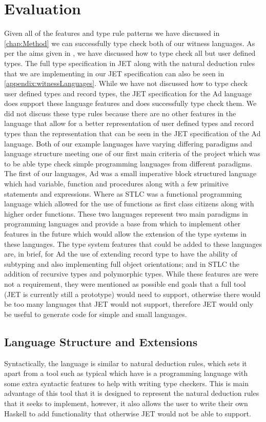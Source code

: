 \chapter{Evaluation}
Given all of the features and type rule patterns we have discussed in \autoref{chap:Method} we can successfully type check both of our witness languages.
As per the aims given in , we have discussed how to type check all but user defined types.
The full type specification in JET along with the natural deduction rules that we are implementing in our JET specification can also be seen in \autoref{appendix:witnessLanguages}.
While we have not discussed how to type check user defined types and record types, the JET specification for the Ad language does support these language features and does successfully type check them.
We did not discuss these type rules because there are no other features in the language that allow for a better representation of user defined types and record types than the representation that can be seen in the JET specification of the Ad language.
Both of our example languages have varying differing paradigms and language structure meeting one of our first main criteria of the project which was to be able type check simple programming languages from different paradigms.
The first of our languages, Ad was a small imperative block structured language which had variable, function and procedures along with a few primitive statements and expressions.
Where as STLC was a functional programming language which allowed for the use of functions as first class citizens along with higher order functions.
These two languages represent two main paradigms in programming languages and provide a base from which to implement other features in the future which would allow the extension of the type systems in these languages.
The type system features that could be added to these languages are, in brief, for Ad the use of extending record type to have the ability of subtyping and also implementing full object orientations; and in STLC the addition of recursive types\cite{pierce2002types,cardelli1996type} and polymorphic types\cite{Cardelli:1985:UTD:6041.6042}.
While these features are were not a requirement, they were mentioned as possible end goals that a full tool (JET is currently still a prototype) would need to support, otherwise there would be too many languages that JET would not support, therefore JET would  only be useful to generate code for simple and small languages.  

\section{Language Structure and Extensions}
Syntactically, the language is similar to natural deduction rules, which sets it apart from a tool such as typical\cite{grimm2007typical} which have is a programming language with some extra syntactic features to help with writing type checkers.
This is main advantage of this tool that it is designed to represent the natural deduction rules that it seeks to implement, however, it also allows the user to write their own Haskell to add functionality that otherwise JET would not be able to support.  


